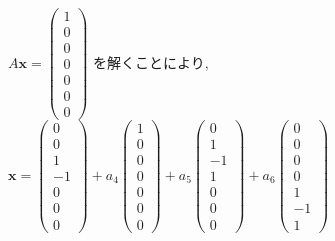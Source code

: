 \documentclass{jsarticle}
\begin{document}
$A\bm{x} = \begin{pmatrix} 1 \\ 0 \\ 0 \\ 0 \\ 0 \\ 0 \\ 0 \end{pmatrix}$ を解くことにより, 
$\bm{x} = \begin{pmatrix} 0 \\ 0 \\ 1 \\ -1 \\ 0 \\ 0 \\ 0 \end{pmatrix} + a_4\begin{pmatrix} 1 \\ 0 \\ 0 \\ 0 \\ 0 \\ 0 \\ 0 \end{pmatrix} + a_5\begin{pmatrix} 0 \\ 1 \\ -1 \\ 1 \\ 0 \\ 0 \\ 0 \end{pmatrix} + a_6\begin{pmatrix} 0 \\ 0 \\ 0 \\ 0 \\ 1 \\ -1 \\ 1 \end{pmatrix}$
\end{document}
